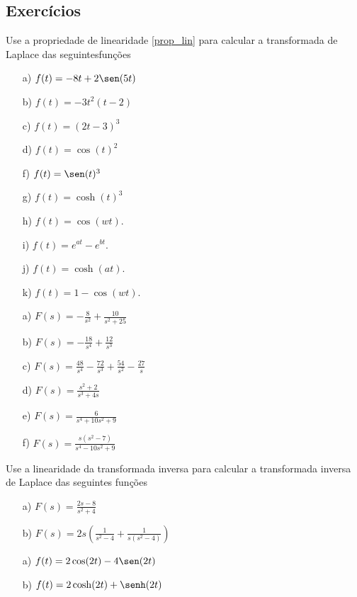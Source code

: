 \subsection*{Exercícios}
\begin{exer} Use a propriedade de linearidade \ref{prop_lin} para calcular a transformada de Laplace das seguintesfunções
 \begin{itemize}
  \item[a)] $f(t)=-8t+2\sen(5t)$
  \item[b)] $f(t)=-3t^2(t-2)$
  \item[c)] $f(t)=(2t-3)^3$
  \item[d)] $f(t)=\cos(t)^2$
  \item[f)] $f(t)=\sen(t)^3$
  \item[g)] $f(t)=\cosh(t)^3$
 \item[h)] $f(t)=\cos(wt)$.
 \item[i)] $f(t)=e^{at}-e^{bt}$.
 \item[j)] $f(t)=\cosh(at)$.
 \item[k)] $f(t)=1-\cos(wt)$.
  \end{itemize}
 \end{exer}
\begin{resp}
 \begin{itemize}
  \item[a)] $F(s)=-\frac{8}{s^2}+\frac{10}{s^2+25}$
  \item[b)] $F(s)=-\frac{18}{s^4}+\frac{12}{s^3}$
  \item[c)] $F(s)=\frac{48}{s^4}-\frac{72}{s^3}+\frac{54}{s^2}-\frac{27}{s}$
  \item[d)] $F(s)=\frac{s^2+2}{s^3+4s}$
  \item[e)] $F(s)=\frac{6}{s^4+10s^2+9}$
  \item[f)] $F(s)=\frac{s(s^2-7)}{s^4-10s^2+9}$
 \end{itemize}
\end{resp}
\begin{exer} Use a linearidade da transformada inversa para calcular a transformada inversa de Laplace das seguintes funções
 \begin{itemize}
  \item[a)] $F(s)=\frac{2s-8}{s^2+4}$
  \item[b)] $F(s)=2s\left(\frac{1}{s^2-4}+\frac{1}{s(s^2-4)}\right)$
 \end{itemize}
 \end{exer}
\begin{resp}
 \begin{itemize}
  \item[a)] $f(t)=2\cos(2t)-4\sen(2t)$
  \item[b)] $f(t)=2\cosh(2t)+\senh(2t)$
 \end{itemize}
\end{resp}
